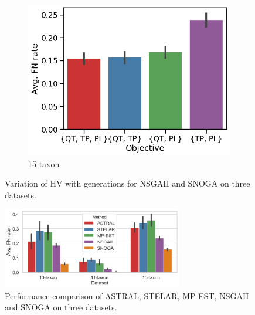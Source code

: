 \begin{figure}[!htbp]
\begin{subfigure}[b]{0.33\textwidth}
		\includegraphics[width=\textwidth]{Figure/15-taxon_obj_wise_perf}
		\caption{15-taxon}
\end{subfigure}
	\caption{Variation of HV with generations for NSGAII and SNOGA on three datasets.}
	\label{fig:obj_wise_perf}
\end{figure}


\begin{figure} [htbp]
\centering
	\includegraphics[width=0.7\textwidth]{Figure/all_dataset_compare}
	\caption{Performance comparison of ASTRAL, STELAR, MP-EST, NSGAII and SNOGA on three datasets. 
} \label{fig:compare_exisitng_methods}
\end{figure}
